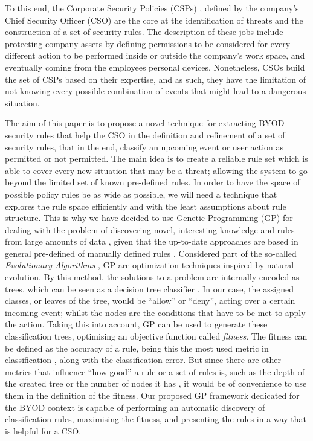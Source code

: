 \documentclass[a4paper,10pt,twocolumn,preprint,3p]{elsarticle}
\begin{document}
To this end, the Corporate Security Policies (CSPs) \cite{Kaeo:2003:DNS:1201807}, 
defined by the company's Chief Security Officer (CSO) are the core at the
identification of threats and the construction of a set of security rules. The description of these jobs include protecting
company assets by defining permissions to be considered for every
different action to be performed inside or outside the company's work
space, and eventually coming from the employees personal
devices. Nonetheless, CSOs build the set of CSPs based on their
expertise, and as such, they have the limitation of not knowing every
possible combination of events that might lead to a dangerous
situation. 

The aim of this paper is to propose a novel technique for extracting
BYOD security rules that help the CSO in the definition and refinement
of a set of security rules, that in the end, classify an upcoming
event or user action as permitted or not permitted.
The main idea is to create a reliable rule set
which is able to cover every new situation that may be a threat;
allowing the system to go beyond the limited set of known pre-defined
rules. In order to have the space of possible policy rules be as wide
as possible, we will need a technique that explores the rule space
efficiently and with the least assumptions about rule structure.
This is why we have decided to use Genetic Programming (GP) for dealing with the problem of
discovering novel, interesting knowledge and rules from large
amounts of data \cite{freitas2002data}, given that the up-to-date approaches are based in general pre-defined of manually defined rules \cite{ali2015analysis}. Considered part of the so-called \emph{Evolutionary
  Algorithms} \cite{back1996evolutionary}, GP are optimization
techniques inspired by natural evolution. By this method, the
solutions to a problem are internally encoded as trees, which can be
seen as a decision tree classifier \cite{safavian1990survey}. In our case, the assigned classes, or leaves of the tree, would be ``allow'' or ``deny'', acting over a certain incoming event; whilst the nodes are the conditions that have to be met to apply the action. Taking this into account, GP can be used to generate these classification trees, optimising an objective function called {\em fitness}. The fitness can be defined as the accuracy of a rule, being this the most used metric in classification \cite{witten2005data}, along with the classification error. But since there are other metrics that influence ``how good'' a rule or a set of rules is, such as the depth of the created tree or the number of nodes it has \cite{back1996evolutionary}, it would be of convenience to use them in the definition of the fitness.
Our proposed GP framework dedicated
for the BYOD context is capable of performing an automatic discovery
of classification rules, maximising the fitness, and presenting the rules in a way that is helpful for a CSO.
\end{document}
